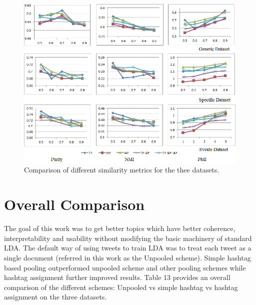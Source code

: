 \documentclass[10pt,a5paper,twoside]{article}
\begin{document}
\begin{figure}[t!]
\begin{center}
\includegraphics[width=.85\textwidth]{Metrics.png}
\end{center}
\caption{\footnotesize Comparison of different similarity metrics for the thee datasets.
} \label{fig:xadd}
\end{figure}




\section{Overall Comparison}
The goal of this work was to get better topics which have better coherence, interpretability and usability without modifying the basic machinery of standard LDA. The default way of using tweets to train LDA was to treat each tweet as a single document (referred in this work as the Unpooled scheme). Simple hashtag based pooling outperformed unpooled scheme and other pooling schemes while hashtag assignment further improved results. Table 13 provides an overall comparison of the different schemes: Unpooled vs simple hashtag vs hashtag assignment on the three datasets.
\\
\end{document}
